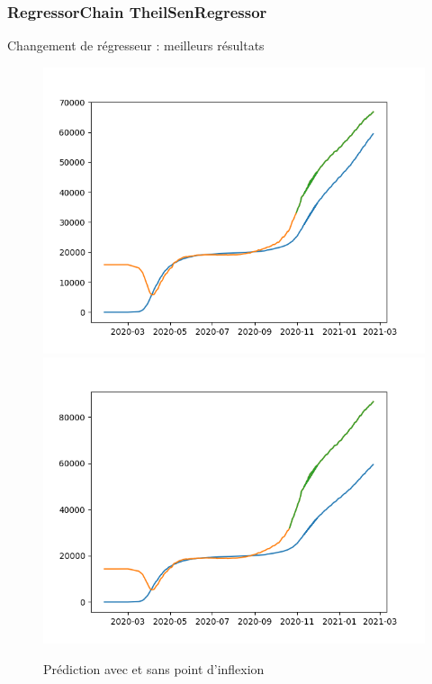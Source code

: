 \documentclass{beamer}
\begin{document}
\begin{frame}
	\frametitle{RegressorChain TheilSenRegressor}
	Changement de régresseur : meilleurs résultats
	\begin{figure}[h]
		\includegraphics[scale=0.327]{theiltruc 9000 iter tol 0,001; 10 jour de plus}
		\includegraphics[scale=0.327]{theiltruc 90000 iter tol 0,001}
		\caption{Prédiction avec et sans point d'inflexion}
	\end{figure}
\end{frame}
\end{document}
